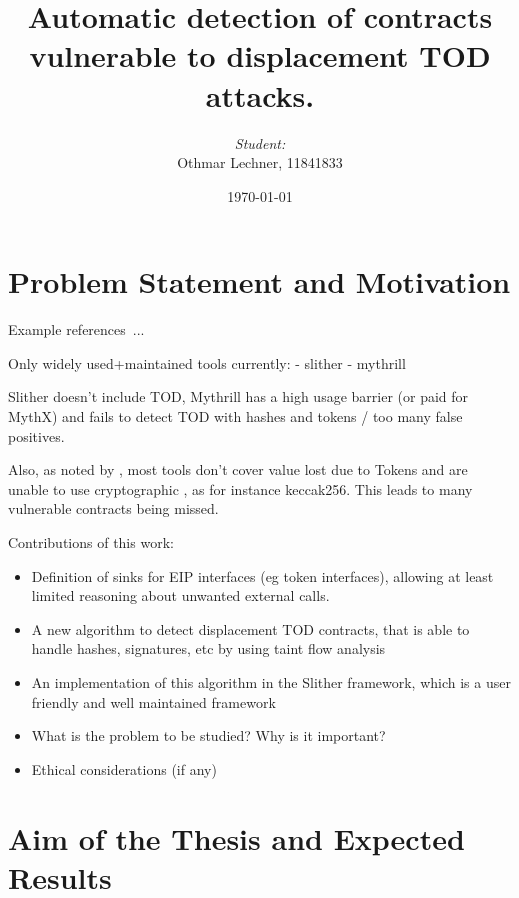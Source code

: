 \documentclass[paper=a4,fontsize=11pt,oneside,titlepage]{scrartcl}
\title{Automatic detection of contracts vulnerable to displacement TOD attacks.}
\author{\textit{Student:}\\
Othmar Lechner, 11841833}
\date{\today}
\begin{document}
\thispagestyle{empty}
\maketitle
\newpage

\section{Problem Statement and Motivation}
\label{sec:problem}

Example references~\cite{CousotCousot1977,Hoare1969}...

Only widely used+maintained tools currently:
- slither
- mythrill

Slither doesn't include TOD, Mythrill has a high usage barrier (or paid for MythX) and  fails to detect TOD with hashes and tokens / too many false positives.

Also, as noted by , most tools don't cover value lost due to Tokens and are unable to use cryptographic , as for instance keccak256. This leads to many vulnerable contracts being missed.

Contributions of this work:
\begin{itemize}
  \item Definition of sinks for EIP interfaces (eg token interfaces), allowing at least limited reasoning about unwanted external calls.
  \item A new algorithm to detect displacement TOD contracts, that is able to handle hashes, signatures, etc by using taint flow analysis
  \item An implementation of this algorithm in the Slither framework, which is a user friendly and well maintained framework
\end{itemize}

\begin{itemize}
\item What is the problem to be studied? Why is it important?
\item Ethical considerations (if any)
\end{itemize}

\section{Aim of the Thesis and Expected Results}
\label{sec:results}
\end{document}
